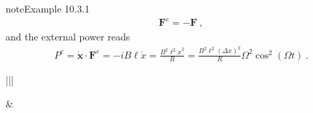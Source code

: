 \documentclass[letterpaper,10pt,italian]{jupyterBook}
\begin{document}
\begin{sphinxadmonition}{note}{Example 10.3.1}
\begin{equation*}
\begin{split}\mathbf{F}^e = - \mathbf{F} \ ,\end{split}
\end{equation*}
\sphinxAtStartPar
and the external power reads
\begin{equation*}
\begin{split}P^e = \dot{\mathbf{x}} \cdot \mathbf{F}^e = - i B \ell \dot{x} = \frac{B^2 \ell^2 \dot{x}^2}{R} = \frac{B^2 \ell^2 \left(\Delta x\right)^2}{R} \Omega^2 \cos^2(\Omega t) \ .\end{split}
\end{equation*}

\begin{savenotes}\sphinxattablestart
\centering
\begin{tabular}[t]{|||}
\hline

\sphinxAtStartPar
{}
&
\sphinxAtStartPar
{}
\\
\hline
\end{tabular}
\par
\sphinxattableend\end{savenotes}


\end{sphinxadmonition}
\end{document}
